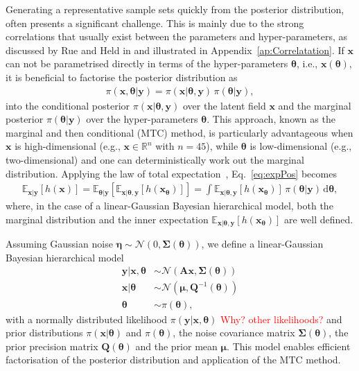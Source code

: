 Generating a representative sample sets quickly from the posterior distribution, often presents a significant challenge. This is mainly due to the strong correlations that usually exist between the parameters and hyper-parameters, as discussed by Rue and Held in \cite{rue2005gaussian} and illustrated in Appendix~\ref{ap:Correlatation}.
If $\bm{x}$ can not be parametrised directly in terms of the hyper-parameters $\bm{\theta}$, i.e., $\bm{x}(\bm{\theta})$, it is beneficial to factorise the posterior distribution as
\begin{align}
	\pi(\bm{x}, \bm{\theta} |  \bm{y}) = \pi(\bm{x} |  \bm{\theta}, \bm{y}) \, \pi(\bm{\theta} |   \bm{y}),
\end{align}
into the conditional posterior $\pi(\bm{x} |  \bm{\theta}, \bm{y})$ over the latent field $\bm{x}$ and the marginal posterior $\pi(\bm{\theta} |  \bm{y})$ over the hyper-parameters $\bm{\theta}$.
This approach, known as the marginal and then conditional (MTC) method, is particularly advantageous when $\bm{x}$ is high-dimensional (e.g., $\bm{x} \in \mathbb{R}^n$ with $n = 45$), while $\bm{\theta}$ is low-dimensional (e.g., two-dimensional) and one can deterministically work out the marginal distribution.
Applying the law of total expectation~\cite{champ2022generalizedlawtotalcovariance}, Eq.~\eqref{eq:expPos} becomes
\begin{align}
	\mathbb{E}_{\bm{x} |  \bm{y}} [h(\bm{x})] 
	= \mathbb{E}_{\bm{\theta} |  \bm{y}} \left[ \mathbb{E}_{\bm{x} |  \bm{\theta}, \bm{y}} [h(\bm{x}_{\bm{\theta}})] \right] 
	= \int \mathbb{E}_{\bm{x} |  \bm{\theta}, \bm{y}} \left[ h(\bm{x}_{\bm{\theta}}) \right] \, \pi(\bm{\theta} |  \bm{y}) \, \mathrm{d}\bm{\theta},
	\label{eq:MargExpPos}
\end{align}
where, in the case of a linear-Gaussian Bayesian hierarchical model, both the marginal distribution and the inner expectation $\mathbb{E}_{\bm{x} |  \bm{\theta}, \bm{y}} \left[ h(\bm{x}_{\bm{\theta}}) \right]$ are well defined.

Assuming Gaussian noise $\bm{\eta} \sim \mathcal{N}(0, \bm{\Sigma}(\bm{\theta}))$, we define a linear-Gaussian Bayesian hierarchical model~\cite{fox2016fast}
\begin{subequations}
	\begin{align}
		\bm{y} |  \bm{x}, \bm{\theta} &\sim \mathcal{N}(\bm{A} \bm{x}, \bm{\Sigma}(\bm{\theta})) \label{eq:likelihood} \\
		\bm{x} |  \bm{\theta} &\sim \mathcal{N}(\bm{\mu}, \bm{Q}^{-1}(\bm{\theta})) \label{eq:xPrior} \\
		\bm{\theta} &\sim \pi(\bm{\theta}) \label{eq:gammaPrior},
	\end{align}
	\label{eq:BayMode}
\end{subequations}
with a normally distributed likelihood $\pi(\bm{y} |  \bm{x}, \bm{\theta})$ \textcolor{red}{Why? other likelihoods?} and prior distributions $\pi(\bm{x} |  \bm{\theta})$ and $\pi(\bm{\theta})$, the noise covariance matrix $\bm{\Sigma}(\bm{\theta})$, the prior precision matrix $\bm{Q}(\bm{\theta})$ and the prior mean $\bm{\mu}$.
This model enables efficient factorisation of the posterior distribution and application of the MTC method.



